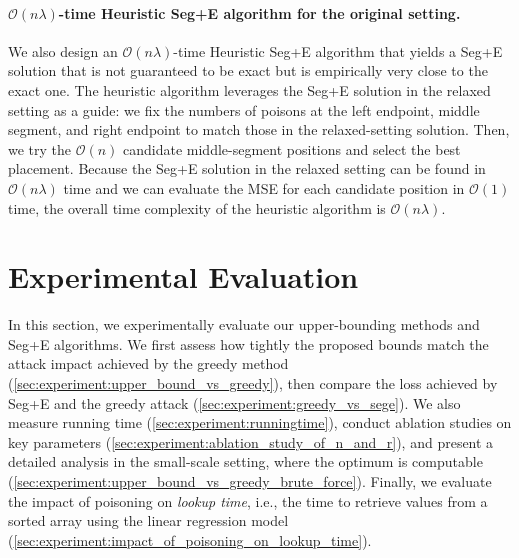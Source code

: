 \documentclass[acmsmall]{acmart}
\begin{document}
\paragraph{$\mathcal{O}(n\lambda)$-time Heuristic Seg+E algorithm for the original setting.}
We also design an $\mathcal{O}(n\lambda)$-time Heuristic Seg+E algorithm that yields a Seg+E solution that is not guaranteed to be exact but is empirically very close to the exact one.
The heuristic algorithm leverages the Seg+E solution in the relaxed setting as a guide:
we fix the numbers of poisons at the left endpoint, middle segment, and right endpoint to match those in the relaxed-setting solution.
Then, we try the $\mathcal{O}(n)$ candidate middle-segment positions and select the best placement.
Because the Seg+E solution in the relaxed setting can be found in $\mathcal{O}(n\lambda)$ time and we can evaluate the MSE for each candidate position in $\mathcal{O}(1)$ time, the overall time complexity of the heuristic algorithm is $\mathcal{O}(n\lambda)$.


\section{Experimental Evaluation}
\label{sec:experimental_evaluation}

In this section, we experimentally evaluate our upper-bounding methods and Seg+E algorithms.
We first assess how tightly the proposed bounds match the attack impact achieved by the greedy method (\cref{sec:experiment:upper_bound_vs_greedy}), then compare the loss achieved by Seg+E and the greedy attack (\cref{sec:experiment:greedy_vs_sege}).
We also measure running time (\cref{sec:experiment:runningtime}), conduct ablation studies on key parameters (\cref{sec:experiment:ablation_study_of_n_and_r}), and present a detailed analysis in the small-scale setting, where the optimum is computable (\cref{sec:experiment:upper_bound_vs_greedy_brute_force}).
Finally, we evaluate the impact of poisoning on \emph{lookup time}, i.e., the time to retrieve values from a sorted array using the linear regression model (\cref{sec:experiment:impact_of_poisoning_on_lookup_time}).
\end{document}
